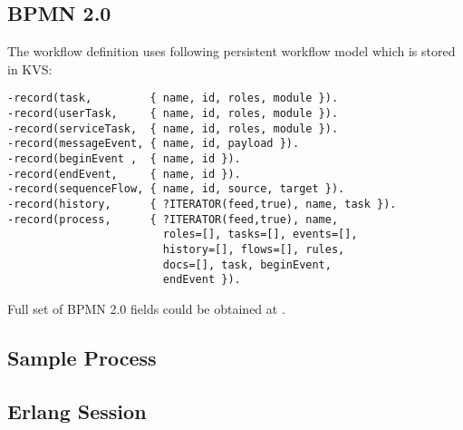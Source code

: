 \newpage

\subsection{BPMN 2.0}

The workflow definition uses following persistent workflow model which is stored in KVS:


\vspace{1\baselineskip}
\begin{lstlisting}
-record(task,         { name, id, roles, module }).
-record(userTask,     { name, id, roles, module }).
-record(serviceTask,  { name, id, roles, module }).
-record(messageEvent, { name, id, payload }).
-record(beginEvent ,  { name, id }).
-record(endEvent,     { name, id }).
-record(sequenceFlow, { name, id, source, target }).
-record(history,      { ?ITERATOR(feed,true), name, task }).
-record(process,      { ?ITERATOR(feed,true), name,
                        roles=[], tasks=[], events=[],
                        history=[], flows=[], rules,
                        docs=[], task, beginEvent,
                        endEvent }).
\end{lstlisting}

Full set of BPMN 2.0 fields could be obtained at .

\newpage

\subsection{Sample Process}

\subsection{Erlang Session}

